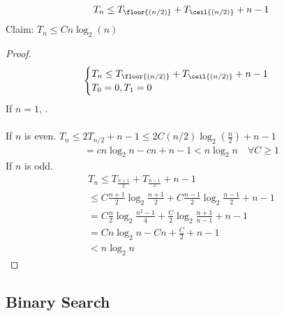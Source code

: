\documentclass[class=scrartcl, crop=false]{standalone}
\begin{document}
\begin{gather*}
  T_n \leq T_{\floor{(n / 2)}} + T_{\ceil{(n / 2)}} + n - 1
\end{gather*} 
Claim: $T_n \leq Cn\log_2(n)$
\begin{proof}
  \begin{gather*}
    \begin{cases}
      T_n \leq T_{\floor{(n / 2)}} + T_{\ceil{(n / 2)}} + n - 1 \\
      T_0 = 0, T_1 = 0
    \end{cases} 
  \end{gather*} 
  If $n = 1$, \cmark. \\\\
  If $n$ is even. $T_n \leq 2T_{n / 2} + n - 1 \leq 2C(n / 2)\log_2(\frac{n}{2}) + n - 1$
  \begin{gather*}
    = cn\log_2n - cn + n - 1 < n\log_2n \quad \forall C \geq 1
  \end{gather*} 
  If $n$ is odd. 
  \begin{gather*}
    T_n \leq T_{\frac{n + 1}{2}} + T_{\frac{n - 1}{2}} + n - 1 \\
    \leq C\frac{n + 1}{2}\log_2\frac{n + 1}{2} + C\frac{n - 1}{2}\log_2\frac{n - 1}{2} + n - 1 
    \\
    = C \frac{n}{2}\log_2\frac{n^2 - 1}{4} + \frac{C}{2}\log_2\frac{n + 1}{n - 1} + n - 1 \\
    = Cn\log_2n - Cn + \frac{C}{2} + n - 1 \\
    < n \log_2n
  \end{gather*} 
\end{proof} 

\subsection{Binary Search}
\end{document}
